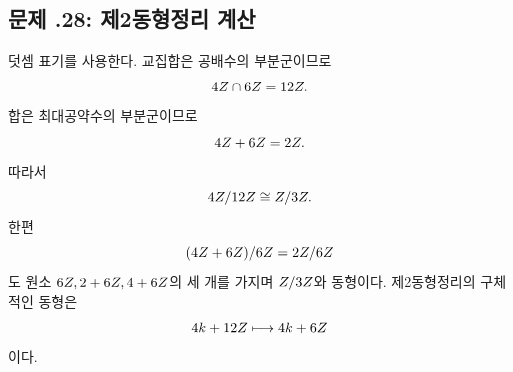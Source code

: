 \subsection*{문제 \thechapter.28: 제2동형정리 계산}

\begin{solution}
덧셈 표기를 사용한다. 교집합은 공배수의 부분군이므로
\[
  4Z\cap6Z=12Z.
\]
합은 최대공약수의 부분군이므로
\[
  4Z+6Z=2Z.
\]
따라서
\[
  4Z/12Z\cong Z/3Z.
\]
한편
\[
  (4Z+6Z)/6Z=2Z/6Z
\]
도 원소 $6Z,2+6Z,4+6Z$의 세 개를 가지며 $Z/3Z$와 동형이다. 제2동형정리의 구체적인 동형은
\[
  4k+12Z\longmapsto4k+6Z
\]
이다.
\end{solution}
